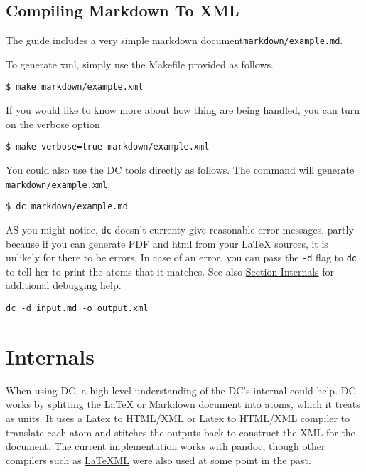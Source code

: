 \subsection{Compiling Markdown To XML}

The guide includes a very simple markdown document\lstinline`markdown/example.md`.

\begin{gram}
To generate xml, simply use the Makefile provided as follows.
%
\begin{lstlisting}
$ make markdown/example.xml
\end{lstlisting}
%
If you would like to know more about how thing are being handled, you can turn on the verbose option
%
\begin{lstlisting}
$ make verbose=true markdown/example.xml 
\end{lstlisting}
\end{gram}

\begin{gram}
You could also use the DC tools directly as follows.
%
The command will generate  \lstinline`markdown/example.xml`.

\begin{lstlisting}
$ dc markdown/example.md
\end{lstlisting}

\end{gram}

\begin{gram} 
AS you might notice, \lstinline`dc` doesn't currenty give reasonable error messages, partly because if you can generate PDF and html from your LaTeX sources, it is unlikely for there to be errors. 
%
In case of an error, you can pass the \lstinline`-d` flag to \lstinline`dc` to tell her to print the atoms that it matches.
%
See also \href{sec:dc::internals}{Section Internals} for additional debugging help.
\begin{lstlisting}
dc -d input.md -o output.xml
\end{lstlisting}
\end{gram}

\section{Internals}
\label{sec:dc::internals}

When using DC, a high-level understanding of the DC's internal could help.
%
DC works by splitting the LaTeX or Markdown document into atoms, which it treats as units.
%
It uses a Latex to HTML/XML or Latex to HTML/XML compiler to translate each atom and stitches the outputs back to construct the XML for the document.
%
The current implementation works with \href{https://www.pandoc.org}{pandoc}, though other compilers such as \href{https://dlmf.nist.gov/LaTeXML/}{LaTeXML} were also used at some point in the past.

